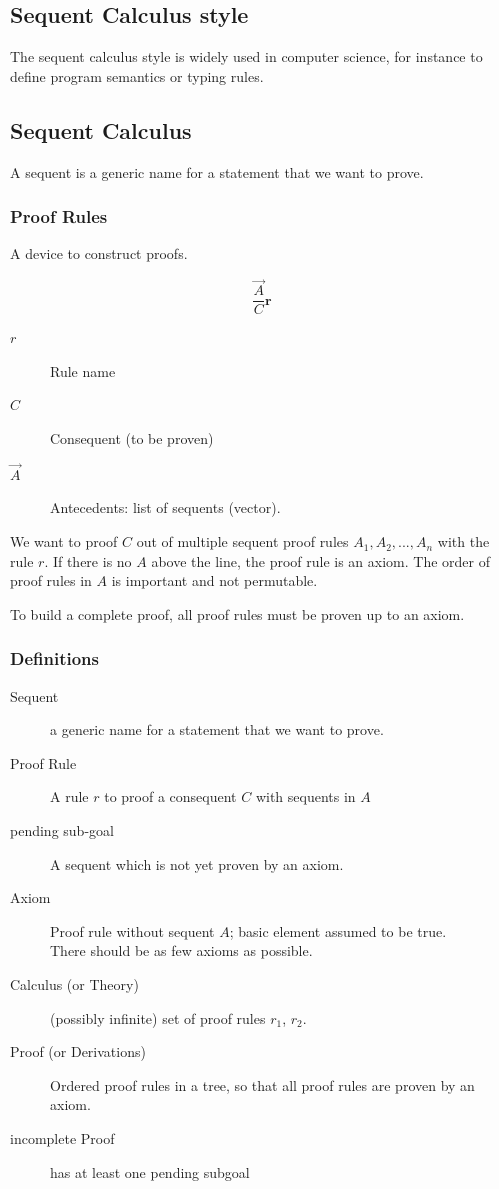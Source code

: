 \subsection{Sequent Calculus style}

The sequent calculus style is widely used in computer science, for instance to define program semantics or typing rules.

\subsection{Sequent Calculus}
A sequent is a generic name for a statement that we want to prove.
\subsubsection{Proof Rules}

A device to construct proofs.

\[
\frac{\overrightarrow{A}}{C} \boldsymbol{r}
\]

\begin{description}
	\item[$r$] Rule name
	\item[$C$] Consequent (to be proven)
	\item[$\vec{A}$] Antecedents: list of sequents (vector).
\end{description}


We want to proof $C$ out of multiple sequent proof rules $A_1, A_2, ..., A_n$ with the rule $r$. If there is no $A$ above the line, the proof rule is an axiom. The order of proof rules in $A$ is important and not permutable.

To build a complete proof, all proof rules must be proven up to an axiom.


\subsubsection{Definitions}

\begin{description}
	\item[Sequent] a generic name for a statement that
we want to prove.
	\item[Proof Rule] A rule $r$ to proof a consequent $C$ with sequents in $A$
	\item[pending sub-goal] A sequent which is not yet proven by an axiom.
	\item[Axiom] Proof rule without sequent $A$; basic element assumed to be true. \\
	There should be as few axioms as possible.
	\item[Calculus (or Theory)] (possibly infinite) set of proof rules $r_1$, $r_2$.
	\item[Proof (or Derivations)] Ordered proof rules in a tree, so that all proof rules are proven by an axiom.
	\item[incomplete Proof] has at least one pending subgoal
\end{description}

